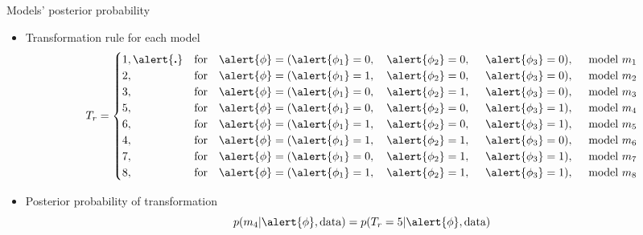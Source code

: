 \documentclass[a4paper,9pt]{beamer}
\begin{document}
\begin{frame}{\huge{Models' posterior  probability}}
\begin{itemize}
\item Transformation rule for each model\\
$$T_r =
    \begin{cases}
       1,  \alert{\textbf{.}} & \text{for} \ \ \ \alert{\phi} = (\alert{\phi_1} = 0, \ \ \ \alert{\phi_2} = 0, \ \ \ \ \alert{\phi_3} = 0), \ \ \ \ \text{model} \ m_1\\
      2, & \text{for} \ \ \ \alert{\phi} = (\alert{\phi_1} = 1, \ \ \ \alert{\phi_2} = 0, \ \ \ \ \alert{\phi_3} = 0), \ \ \ \ \text{model} \ m_2\\
      3, & \text{for} \ \ \ \alert{\phi} = (\alert{\phi_1} = 0, \ \ \ \alert{\phi_2} = 1, \ \ \ \ \alert{\phi_3} = 0), \ \ \ \ \text{model} \ m_3\\
      5, & \text{for} \ \ \ \alert{\phi} = (\alert{\phi_1} = 0, \ \ \ \alert{\phi_2} = 0, \ \ \ \ \alert{\phi_3} = 1), \ \ \ \ \text{model} \ m_4\\
      6, & \text{for} \ \ \ \alert{\phi} = (\alert{\phi_1} = 1, \ \ \ \alert{\phi_2} = 0, \ \ \ \ \alert{\phi_3} = 1), \ \ \ \ \text{model} \ m_5\\
      4, & \text{for} \ \ \ \alert{\phi} = (\alert{\phi_1} = 1, \ \ \ \alert{\phi_2} = 1, \ \ \ \ \alert{\phi_3} = 0), \ \ \ \ \text{model} \ m_6\\
      7, & \text{for} \ \ \ \alert{\phi} = (\alert{\phi_1} = 0, \ \ \ \alert{\phi_2} = 1, \ \ \ \ \alert{\phi_3} = 1), \ \ \ \ \text{model} \ m_7\\
      8, & \text{for} \ \ \ \alert{\phi} = (\alert{\phi_1} = 1, \ \ \ \alert{\phi_2} = 1, \ \ \ \ \alert{\phi_3} = 1), \ \ \ \ \text{model} \ m_8
\end{cases}$$
\vspace{0.15in}
\item Posterior probability of transformation
    $$p(m_4|\alert{\phi}, \text{data}) = p(T_r = 5|\alert{\phi}, \text{data})$$
    \end{itemize}
\end{frame}
\end{document}
